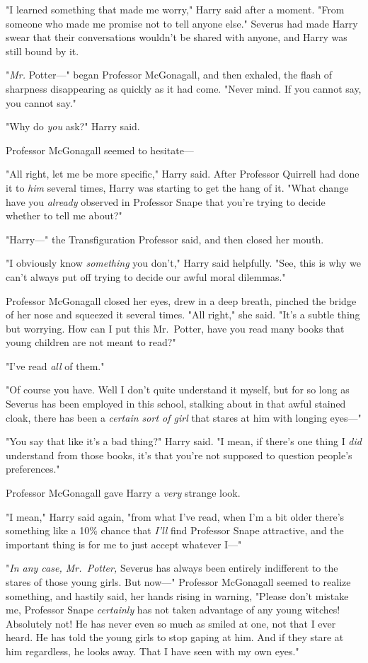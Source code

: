 "I learned something that made me worry," Harry said after a moment. "From
someone who made me promise not to tell anyone else." Severus had made Harry
swear that their conversations wouldn't be shared with anyone, and Harry was
still bound by it.

"\emph{Mr.} Potter—" began Professor McGonagall, and then exhaled, the flash
of sharpness disappearing as quickly as it had come. "Never mind. If you cannot
say, you cannot say."

"Why do \emph{you} ask?" Harry said.

Professor McGonagall seemed to hesitate—

"All right, let me be more specific," Harry said. After Professor Quirrell had
done it to \emph{him} several times, Harry was starting to get the hang of it.
"What change have you \emph{already} observed in Professor Snape that you're
trying to decide whether to tell me about?"

"Harry—" the Transfiguration Professor said, and then closed her mouth.

"I obviously know \emph{something} you don't," Harry said helpfully. "See, this
is why we can't always put off trying to decide our awful moral dilemmas."

Professor McGonagall closed her eyes, drew in a deep breath, pinched the bridge
of her nose and squeezed it several times. "All right," she said. "It's a
subtle thing{\el} but worrying. How can I put this{\el} Mr.~Potter, have
you read many books that young children are not meant to read?"

"I've read \emph{all} of them."

"Of course you have. Well{\el} I don't quite understand it myself, but for
so long as Severus has been employed in this school, stalking about in that
awful stained cloak, there has been a \emph{certain sort of girl} that stares
at him with longing eyes—"

"You say that like it's a bad thing?" Harry said. "I mean, if there's one thing
I \emph{did} understand from those books, it's that you're not supposed to
question people's preferences."

Professor McGonagall gave Harry a \emph{very} strange look.

"I mean," Harry said again, "from what I've read, when I'm a bit older there's
something like a 10\% chance that \emph{I'll} find Professor Snape attractive,
and the important thing is for me to just accept whatever I—"

"\emph{In any case, Mr.~Potter,} Severus has always been entirely indifferent
to the stares of those young girls. But now—" Professor McGonagall seemed to
realize something, and hastily said, her hands rising in warning, "Please don't
mistake me, Professor Snape \emph{certainly} has not taken advantage of any
young witches! Absolutely not! He has never even so much as smiled at one, not
that I ever heard. He has told the young girls to stop gaping at him. And if
they stare at him regardless, he looks away. That I have seen with my own eyes."

